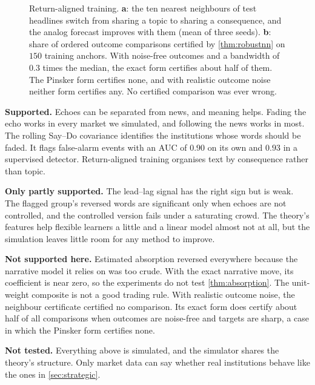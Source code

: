 \documentclass[11pt,a4paper]{article}
\theoremstyle{plain}
\theoremstyle{definition}
\theoremstyle{remark}
\begin{document}
\begin{figure}[ht]
\begin{minipage}[t]{0.48\textwidth}
\end{minipage}
\caption{Return-aligned training. \textbf{a}: the ten nearest neighbours of test headlines switch from sharing a topic to sharing a consequence, and the analog forecast improves with them (mean of three seeds). \textbf{b}: share of ordered outcome comparisons certified by \cref{thm:robustnn} on $150$ training anchors. With noise-free outcomes and a bandwidth of $0.3$ times the median, the exact form certifies about half of them. The Pinsker form certifies none, and with realistic outcome noise neither form certifies any. No certified comparison was ever wrong.}
\label{fig:text}
\end{figure}


\begin{tcolorbox}[enhanced,breakable,colback=gray!4,colframe=gray!55!black,boxrule=0.6pt,arc=2pt,
  fonttitle=\bfseries\small,title={What the experiments show, and what they do not},left=8pt,right=8pt]
\small
\textbf{Supported.} Echoes can be separated from news, and meaning helps. Fading the echo works in every market we simulated, and following the news works in most. The rolling Say--Do covariance identifies the institutions whose words should be faded. It flags false-alarm events with an AUC of $0.90$ on its own and $0.93$ in a supervised detector. Return-aligned training organises text by consequence rather than topic.

\textbf{Only partly supported.} The lead--lag signal has the right sign but is weak. The flagged group's reversed words are significant only when echoes are not controlled, and the controlled version fails under a saturating crowd. The theory's features help flexible learners a little and a linear model almost not at all, but the simulation leaves little room for any method to improve.

\textbf{Not supported here.} Estimated absorption reversed everywhere because the narrative model it relies on was too crude. With the exact narrative move, its coefficient is near zero, so the experiments do not test \cref{thm:absorption}. The unit-weight composite is not a good trading rule. With realistic outcome noise, the neighbour certificate certified no comparison. Its exact form does certify about half of all comparisons when outcomes are noise-free and targets are sharp, a case in which the Pinsker form certifies none.

\textbf{Not tested.} Everything above is simulated, and the simulator shares the theory's structure. Only market data can say whether real institutions behave like the ones in \cref{sec:strategic}.
\end{tcolorbox}
\end{document}
